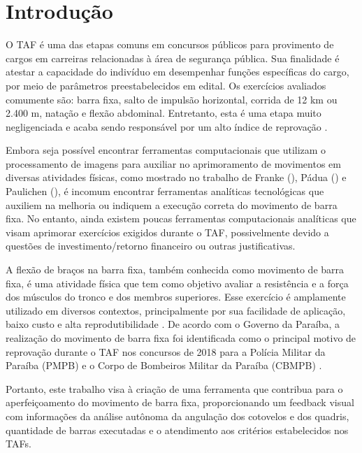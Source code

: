 \chapter{Introdução}


O \ac{TAF} é uma das etapas comuns em concursos públicos para provimento de cargos em carreiras relacionadas à área de segurança pública. Sua finalidade é atestar a capacidade do indivíduo em desempenhar funções específicas do cargo, por meio de parâmetros preestabelecidos em edital. Os exercícios avaliados comumente são: barra fixa, salto de impulsão horizontal, corrida de 12 km ou 2.400 m, natação e flexão abdominal. Entretanto, esta é uma etapa muito negligenciada e acaba sendo responsável por um alto índice de reprovação \cite{reprovaTAF}.

Embora seja possível encontrar ferramentas computacionais que utilizam o processamento de imagens para auxiliar no aprimoramento de movimentos em diversas atividades físicas, como mostrado no trabalho de Franke (\citeyear{vcBicicleta}), Pádua (\citeyear{vcFutebol}) e Paulichen (\citeyear{futebolTatica}), é incomum encontrar ferramentas analíticas tecnológicas que auxiliem na melhoria ou indiquem a execução correta do movimento de barra fixa. No entanto, ainda existem poucas ferramentas computacionais analíticas que visam aprimorar exercícios exigidos durante o \ac{TAF}, possivelmente devido a questões de investimento/retorno financeiro ou outras justificativas.

A flexão de braços na barra fixa, também conhecida como movimento de barra fixa, é uma atividade física que tem como objetivo avaliar a resistência e a força dos músculos do tronco e dos membros superiores. Esse exercício é amplamente utilizado em diversos contextos, principalmente por sua facilidade de aplicação, baixo custo e alta reprodutibilidade \cite{barraFixa}. De acordo com o Governo da Paraíba, a realização do movimento de barra fixa foi identificada como o principal motivo de reprovação durante o \ac{TAF} nos concursos de 2018 para a Polícia Militar da Paraíba (PMPB) e o Corpo de Bombeiros Militar da Paraíba (CBMPB) \cite{barraTAF}.

Portanto, este trabalho visa à criação de uma ferramenta que contribua para o aperfeiçoamento do movimento de barra fixa, proporcionando um feedback visual com informações da análise autônoma da angulação dos cotovelos e dos quadris, quantidade de barras executadas e o atendimento aos critérios estabelecidos nos \ac{TAF}s.